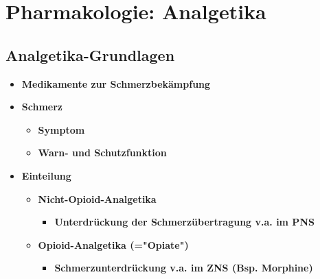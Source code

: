 \section{Pharmakologie: Analgetika}
\subsection{Analgetika-Grundlagen}
	\begin{itemize}
		\item \textbf{Medikamente zur Schmerzbekämpfung}
		\item \textbf{Schmerz}
			\begin{itemize}
				\item \textbf{Symptom}
				\item \textbf{Warn- und Schutzfunktion}
			\end{itemize}
		\item \textbf{Einteilung}
			\begin{itemize}
				\item \textbf{Nicht-Opioid-Analgetika}
					\begin{itemize}
						\item \textbf{Unterdrückung der Schmerzübertragung v.a. im PNS}
					\end{itemize}
				\item \textbf{Opioid-Analgetika (="Opiate")}
					\begin{itemize}
						\item \textbf{Schmerzunterdrückung v.a. im ZNS (Bsp. Morphine)}
					\end{itemize}
			\end{itemize}
	\end{itemize}

